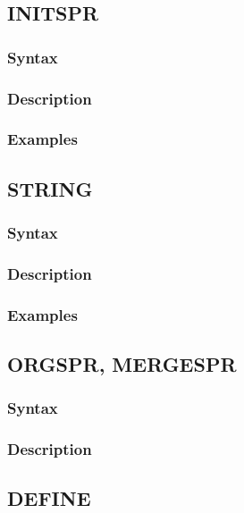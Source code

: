     \subsection{INITSPR}
        \subsubsection{Syntax}

        \subsubsection{Description}

        \subsubsection{Examples}

    \subsection{STRING}
        \subsubsection{Syntax}

        \subsubsection{Description}

        \subsubsection{Examples}


    \subsection{ORGSPR, MERGESPR}
        \subsubsection{Syntax}

        \subsubsection{Description}

    \subsection{DEFINE}
